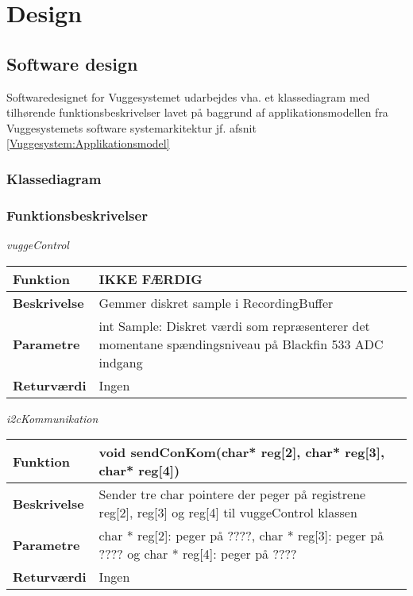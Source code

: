 \section{Design}

\newpage
\subsection{Software design}
Softwaredesignet for Vuggesystemet udarbejdes vha. et klassediagram med tilhørende funktionsbeskrivelser lavet på baggrund af applikationsmodellen fra Vuggesystemets software systemarkitektur jf. afsnit \ref{Vuggesystem:Applikationsmodel}

\subsubsection*{Klassediagram}

\subsubsection*{Funktionsbeskrivelser}
\textit{vuggeControl} \\
\begin{center}
    \begin{tabular}{ | l | p{10cm} |}
    \hline
    \textbf{Funktion}	 	& IKKE FÆRDIG								\\ \hline
    \textbf{Beskrivelse} 	& Gemmer diskret sample i RecordingBuffer					\\ \hline
    \textbf{Parametre}		& int Sample: Diskret værdi som repræsenterer det momentane spændingsniveau på Blackfin 533 ADC indgang														 		\\ \hline
    \textbf{Returværdi} 	& Ingen		 												\\ \hline
    \end{tabular}
\end{center}
\textit{i2cKommunikation} \\

\begin{center}
    \begin{tabular}{ | l | p{10cm} |}
    \hline
    \textbf{Funktion}	 	& void sendConKom(char* reg[2], char* reg[3], char* reg[4])								\\ \hline
    \textbf{Beskrivelse} 	& Sender tre char pointere der peger på registrene reg[2], reg[3] og reg[4] til vuggeControl klassen					\\ \hline
    \textbf{Parametre}		& char * reg[2]: peger på ????, char * reg[3]: peger på ???? og char * reg[4]: peger på ????				 		\\ \hline
    \textbf{Returværdi} 	& Ingen		 												\\ \hline
    \end{tabular}
\end{center}

